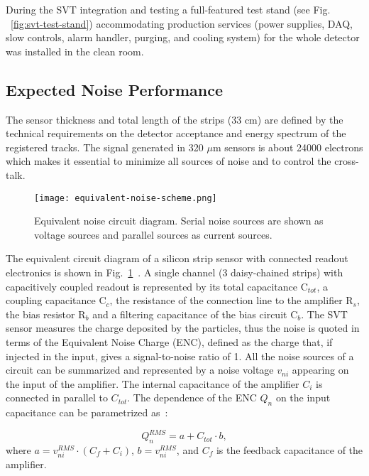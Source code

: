 During the SVT integration and testing a full-featured test stand (see Fig. ~\ref{fig:svt-test-stand}) accommodating production services (power supplies, DAQ, slow controls, alarm handler, purging, and cooling system) for the whole detector was installed in the clean room.

\subsection{Expected Noise Performance}

The sensor thickness and total length of the strips (33 cm) are defined by the technical requirements on the detector acceptance and energy spectrum of the registered tracks. The signal generated in 320 $\mu$m sensors is about 24000 electrons which makes it essential to minimize all sources of noise and to control the cross-talk. 

\begin{figure}[hbt] 
\centering 
\texttt{[image: equivalent-noise-scheme.png]}
\caption{Equivalent noise circuit diagram. Serial noise sources are shown as voltage sources and
parallel sources as current sources.}
\label{fig:equivalent-noise-scheme}
\end{figure}

The equivalent circuit diagram of a silicon strip sensor with connected readout electronics is shown in Fig.~\ref{fig:equivalent-noise-scheme}~\cite{SPIELER}. A single channel (3 daisy-chained strips) with capacitively coupled readout is represented by its total capacitance C$_{tot}$, a coupling capacitance C$_c$, the resistance of the connection line to the amplifier R$_s$, the bias resistor R$_b$ and a filtering capacitance of the bias circuit C$_b$. The SVT sensor measures the charge deposited by the particles, thus the noise is quoted in terms of the Equivalent Noise Charge (ENC), defined as the charge that, if injected in the input, gives a signal-to-noise ratio of 1. All the noise sources of a circuit can be summarized and represented by a noise voltage $v_{ni}$ appearing on the input of the amplifier. The internal capacitance of the amplifier $C_i$ is connected in parallel to $C_{tot}$. The dependence of the ENC $Q_n$ on the input capacitance can be parametrized as~\cite{BLOCHTHESIS}:

\begin{equation} Q^{RMS}_{n}=a+C_{tot}{\cdot}b  \label{eq:qn},
\end{equation}
where $a = v^{RMS}_{ni} \cdot (C_{f} + C_{i})$, $b = v^{RMS}_{ni}$, and $C_f$ is the feedback capacitance of the amplifier.

